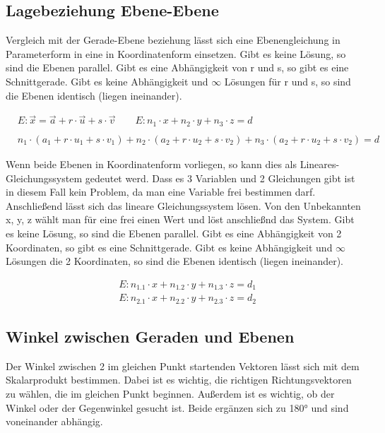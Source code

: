 \subsection{Lagebeziehung Ebene-Ebene}

Vergleich mit der Gerade-Ebene beziehung lässt sich eine Ebenengleichung in Parameterform
in eine in Koordinatenform einsetzen.
Gibt es keine Lösung, so sind die Ebenen parallel.
Gibt es eine Abhängigkeit von r und s, so gibt es eine Schnittgerade.
Gibt es keine Abhängigkeit und $\infty$ Lösungen für r und s, so sind die Ebenen
identisch (liegen ineinander).

\begin{align*}
    & E: \vec{x} = \vec{a} + r \cdot \vec{u} + s \cdot \vec{v}
    \qquad E: n_1 \cdot x + n_2 \cdot y + n_3 \cdot z = d \\
    \\
    & n_1 \cdot (a_1 + r \cdot u_1 + s \cdot v_1) + n_2 \cdot (a_2 + r \cdot u_2 + s \cdot v_2) + n_3 \cdot (a_2 + r \cdot u_2 + s \cdot v_2) = d
\end{align*}

Wenn beide Ebenen in Koordinatenform vorliegen, so kann dies als Lineares-Gleichungssystem
gedeutet werd. Dass es 3 Variablen und 2 Gleichungen gibt ist in diesem Fall kein Problem,
da man eine Variable frei bestimmen darf. Anschließend lässt sich das lineare Gleichungssystem
lösen. Von den Unbekannten x, y, z wählt man für eine frei einen Wert und löst anschließnd
das System.
Gibt es keine Lösung, so sind die Ebenen parallel.
Gibt es eine Abhängigkeit von 2 Koordinaten, so gibt es eine Schnittgerade.
Gibt es keine Abhängigkeit und $\infty$ Lösungen die 2 Koordinaten, so sind die Ebenen
identisch (liegen ineinander).

\begin{align*}
    & E: n_{1.1} \cdot x + n_{1.2} \cdot y + n_{1.3} \cdot z = d_1 \\
    & E: n_{2.1} \cdot x + n_{2.2} \cdot y + n_{2.3} \cdot z = d_2
\end{align*}

\clearpage

\subsection{Winkel zwischen Geraden und Ebenen}

Der Winkel zwischen 2 im gleichen Punkt startenden Vektoren lässt sich mit dem
Skalarprodukt bestimmen. Dabei ist es wichtig, die richtigen Richtungsvektoren
zu wählen, die im gleichen Punkt beginnen.
Außerdem ist es wichtig, ob der Winkel oder der Gegenwinkel gesucht ist.
Beide ergänzen sich zu 180° und sind voneinander abhängig.

